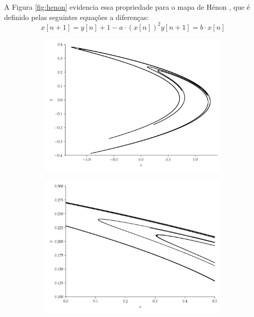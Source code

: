 \documentclass[a4paper, 12pt]{article}
\begin{document}
A Figura \ref{fig:henon} evidencia essa propriedade para o mapa de Hénon \cite{henon1976two}, que é definido pelas seguintes equações a diferenças:
\begin{subequations}
\begin{equation}
x[n+1] = y[n] + 1 - a\cdot (x[n])^2
\end{equation}
\begin{equation}
y[n+1] = b \cdot x[n]
\end{equation}
\end{subequations}
\begin{figure}[!ht]
	\centering
	\begin{subfigure}[b]{0.45\textwidth}
		\includegraphics[scale=0.4]{mapa-de-henon.png}
	\end{subfigure}
	\begin{subfigure}[b]{0.45\textwidth}
		\includegraphics[scale=0.4]{mapa-de-henon-zoom.png}

\end{subfigure}
\end{figure}
\end{document}
